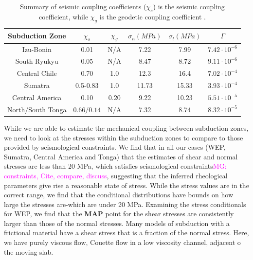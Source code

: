 \documentclass[12pt]{article}
\newcommand{\mgnote}[1]{\textcolor{magenta}{MG: #1}}
\begin{document}
{   \begin{table}[H]
  \caption{Summary of seismic coupling coefficients ($\chi_s$) is the seismic coupling coefficient, while $\chi_g$ is the geodetic coupling coefficient \citep{scholz2012seismic}.} %
  \centering  %
  \begin{tabular}{c c c c c c} %
    \hline \hline                        %
    Subduction Zone & $\chi_s$ & $\chi_g$ & $\sigma_n (MPa)$ & $\sigma_t (MPa)$ & $\Gamma$ \\ [0.5ex] %
    \hline                  %
    Izu-Bonin &0.01 &N/A &7.22 &7.99 & $7.42 \cdot 10^{-6}$\\
    South Ryukyu  &0.05 &N/A &8.47&8.72 & $9.11 \cdot 10^{-6}$\\
    Central Chile &0.70 &1.0 &12.3 &16.4 & $7.02 \cdot 10^{-4}$ \\
    Sumatra &0.5-0.83 &1.0 &11.73 & 15.33 &$3.93 \cdot 10^{-4}$\\
    Central America &0.10 &0.20 &9.22 & 10.23 & $5.51 \cdot 10^{-5}$ \\
    North$/$South Tonga & $0.66/0.14$ &N/A &7.32 & 8.74 & $8.32 \cdot 10^{-5}$ \\
    \hline %
  \end{tabular}
  \label{table:coupling_summary} %
\end{table}

   
   While we are able to estimate the mechanical coupling between subduction zones, we need to look at the stresses within the subduction zones to compare to those provided by seismological constraints. We find that in all our cases (WEP, Sumatra, Central America and Tonga) that the estimates of shear and normal stresses are less than 20 MPa, which satisfies seismological constraints\mgnote{constraints, Cite, compare, discuss}, suggesting that the inferred rheological parameters give rise a reasonable state of stress. While the stress values are in the correct range, we find that the conditional distributions have bounds on how large the stresses are-which are under 20 MPa. Examining the stress conditionals for WEP, we find that the \textbf{MAP} point for the shear stresses are consistently larger than those of the normal stresses. 
Many models of subduction with a frictional material have a shear stress that is a fraction of the normal stress.
Here, we have purely viscous flow, Couette flow in a low viscosity  channel, adjacent o the  moving slab.
   
}
\end{document}
